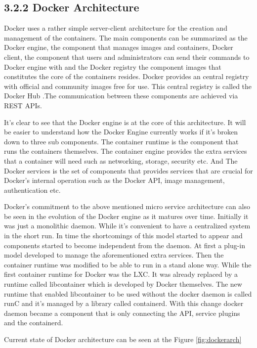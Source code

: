 \documentclass[12pt,oneandhalf,chaparabic,ceng,ms,eng,oneside,pntc]{gsufbe}
\begin{document}
\subsection[Docker Architecture]{3.2.2 Docker Architecture}
Docker uses a rather simple server-client architecture for the creation and management of the
containers.  The main components can be summarized as the Docker engine, the component that manages
images and containers, Docker client, the component that users and administrators can send their
commands to Docker engine with and the Docker registry the component images that constitutes the core of
the containers resides.  Docker provides an central registry with official and community images free for
use.  This central registry is called the Docker Hub \cite{docker_hub}
.The communication between these components are achieved via REST APIs.

It's clear to see that the Docker engine is at the core of this architecture.  It will be easier to
understand how the Docker Engine currently works if it's broken down to three sub components.  The
container runtime is the component that runs the containers themselves.  The container engine provides
the extra services that a container will need such as networking, storage, security etc.  And The Docker 
services is the set of components that provides services that are crucial for Docker's internal
operation such as the Docker API, image management, authentication etc.

Docker's commitment to the above mentioned micro service architecture can also be seen in the evolution
of the Docker engine as it matures over time.  Initially it was just a monolithic daemon.  While it's
convenient to have a centralized system in the short run.  In time the shortcomings of this model
started to appear and components started to become independent from the daemon.  At first a plug-in
model developed to manage the aforementioned extra services.  Then the container runtime was modified to
be able to run in a stand alone way.  While the first container runtime for Docker was the LXC.  It was
already replaced by a runtime called libcontainer which is developed by Docker themselves.  The new
runtime that enabled libcontainer to be used without the docker daemon is called runC and it's managed
by a library called containerd.  With this change docker daemon became a component that is only
connecting the API, service plugins and the containerd.

Current state of Docker architecture can be seen at the Figure \ref{fig:dockerarch}
\end{document}
